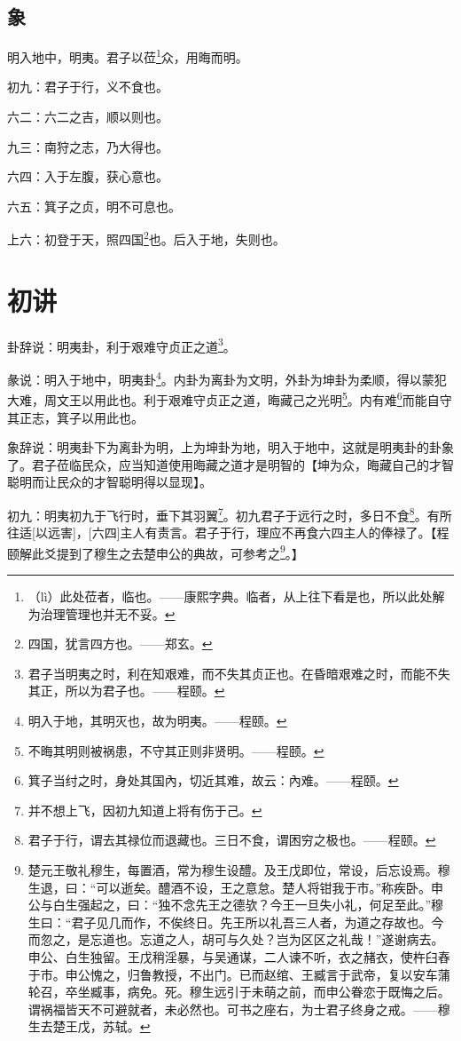 \documentclass[12pt,oneside]{book}
\begin{document}
\subsection{象}
明入地中，明夷。君子以莅\footnote{（lì）此处莅者，临也。——康熙字典。临者，从上往下看是也，所以此处解为治理管理也并无不妥。}众，用晦而明。

初九：君子于行，义不食也。

六二：六二之吉，顺以则也。

九三：南狩之志，乃大得也。

六四：入于左腹，获心意也。

六五：箕子之贞，明不可息也。

上六：初登于天，照四国\footnote{四国，犹言四方也。——郑玄。}也。后入于地，失则也。

\section{初讲}
卦辞说：明夷卦，利于艰难守贞正之道\footnote{君子当明夷之时，利在知艰难，而不失其贞正也。在昏暗艰难之时，而能不失其正，所以为君子也。——程颐。}。

彖说：明入于地中，明夷卦\footnote{明入于地，其明灭也，故为明夷。——程颐。}。内卦为离卦为文明，外卦为坤卦为柔顺，得以蒙犯大难，周文王以用此也。利于艰难守贞正之道，晦藏己之光明\footnote{不晦其明则被祸患，不守其正则非贤明。——程颐。}。内有难\footnote{箕子当纣之时，身处其国內，切近其难，故云：內难。——程颐。}而能自守其正志，箕子以用此也。

象辞说：明夷卦下为离卦为明，上为坤卦为地，明入于地中，这就是明夷卦的卦象了。君子莅临民众，应当知道使用晦藏之道才是明智的【坤为众，晦藏自己的才智聪明而让民众的才智聪明得以显现】。

初九：明夷初九于飞行时，垂下其羽翼\footnote{并不想上飞，因初九知道上将有伤于己。}。初九君子于远行之时，多日不食\footnote{君子于行，谓去其禄位而退藏也。三日不食，谓困穷之极也。——程颐。}。有所往适[以远害]，[六四]主人有责言。君子于行，理应不再食六四主人的俸禄了。【程颐解此爻提到了穆生之去楚申公的典故，可参考之\footnote{楚元王敬礼穆生，每置酒，常为穆生设醴。及王戊即位，常设，后忘设焉。穆生退，曰：“可以逝矣。醴酒不设，王之意怠。楚人将钳我于市。”称疾卧。申公与白生强起之，曰：“独不念先王之德欤？今王一旦失小礼，何足至此。”穆生曰：“君子见几而作，不俟终日。先王所以礼吾三人者，为道之存故也。今而忽之，是忘道也。忘道之人，胡可与久处？岂为区区之礼哉！”遂谢病去。申公、白生独留。王戊稍淫暴，与吴通谋，二人谏不听，衣之赭衣，使杵臼舂于市。申公愧之，归鲁教授，不出门。已而赵绾、王臧言于武帝，复以安车蒲轮召，卒坐臧事，病免。死。穆生远引于未萌之前，而申公眷恋于既悔之后。谓祸福皆天不可避就者，未必然也。可书之座右，为士君子终身之戒。——穆生去楚王戊，苏轼。}。】
\end{document}
